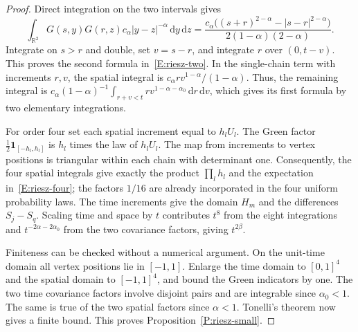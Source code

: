 \documentclass[12pt]{article}
\numberwithin{equation}{section}
\theoremstyle{definition}
\newcommand{\R}{\mathbb{R}}
\newcommand{\ud}{\,\mathrm{d}}
\begin{document}
\begin{proof}
  Direct integration on the two intervals gives
  \[
    \int_{\R^2}G(s,y)G(r,z)c_\alpha|y-z|^{-\alpha}\ud y\ud z
    =\frac{c_\alpha\big((s+r)^{2-\alpha}-|s-r|^{2-\alpha}\big)}
    {2(1-\alpha)(2-\alpha)}.
  \]
  Integrate on $s>r$ and double, set $v=s-r$, and integrate $r$ over
  $(0,t-v)$. This proves the second formula
  in~\eqref{E:riesz-two}. In the single-chain term with increments
  $r,v$, the spatial integral is $c_\alpha rv^{1-\alpha}/(1-\alpha)$.
  Thus, the remaining integral is
  $c_\alpha(1-\alpha)^{-1}\int_{r+v<t}rv^{1-\alpha-\alpha_0}\ud r\ud v$,
  which gives its first formula by two elementary integrations.

  For order four set each spatial increment equal to $h_lU_l$.
  The Green factor $\frac12\mathbf1_{[-h_l,h_l]}$ is $h_l$ times
  the law of $h_lU_l$. The map from increments to vertex positions is
  triangular within each chain with determinant one. Consequently,
  the four spatial integrals give exactly the product $\prod_lh_l$
  and the expectation in~\eqref{E:riesz-four}; the factors $1/16$ are
  already incorporated in the four uniform probability laws. The time
  increments give the domain $H_m$ and the differences $S_j-S_q$.
  Scaling time and space by $t$ contributes $t^8$ from the eight
  integrations and $t^{-2\alpha-2\alpha_0}$ from the two covariance
  factors, giving $t^{2\beta}$.

  Finiteness can be checked without a numerical argument. On the
  unit-time domain all vertex positions lie in $[-1,1]$. Enlarge the
  time domain to $[0,1]^4$ and the spatial domain to $[-1,1]^4$, and
  bound the Green indicators by one. The two time covariance factors
  involve disjoint pairs and are integrable since $\alpha_0<1$.
  The same is true of the two spatial factors since $\alpha<1$.
  Tonelli's theorem now gives a finite bound. This proves
  Proposition~\ref{P:riesz-small}.
\end{proof}
\end{document}
